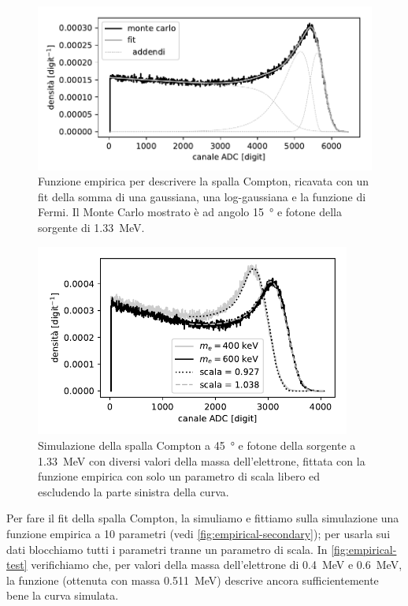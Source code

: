 \begin{figure}
	\centering
	\includegraphics[width=33em]{empirical-secondary}
	\caption{\label{fig:empirical-secondary}
	Funzione empirica per descrivere la spalla Compton,
	ricavata con un fit della somma di una gaussiana, una log-gaussiana e la funzione di Fermi.
	Il Monte Carlo mostrato è ad angolo \SI{15}{\degree} e fotone della sorgente di \SI{1.33}{MeV}.}
\end{figure}

\begin{figure}
	\centering
	\includegraphics[width=28em]{empirical-test}
	\caption{\label{fig:empirical-test}
	Simulazione della spalla Compton a \SI{45}{\degree} e fotone della sorgente a \SI{1.33}{MeV}
	con diversi valori della massa dell'elettrone,
	fittata con la funzione empirica con solo un parametro di scala libero
	ed escludendo la parte sinistra della curva.}
\end{figure}

Per fare il fit della spalla Compton,
la simuliamo e fittiamo sulla simulazione una funzione empirica a 10 parametri
(vedi \autoref{fig:empirical-secondary});
per usarla sui dati blocchiamo tutti i parametri tranne un parametro di scala.
In \autoref{fig:empirical-test} verifichiamo che,
per valori della massa dell'elettrone di \SI{0.4}{MeV} e \SI{0.6}{MeV},
la funzione (ottenuta con massa \SI{0.511}{MeV}) descrive ancora sufficientemente bene la curva simulata.\footnotemark
{}

